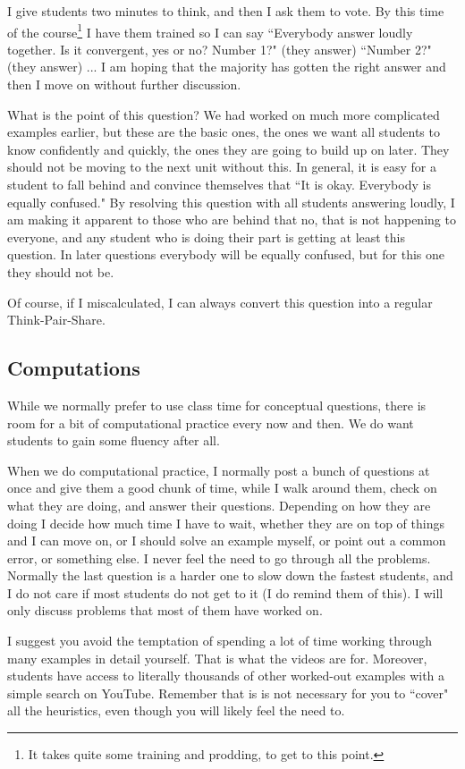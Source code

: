 \documentclass[11pt]{article}
\begin{document}
\begin{example}
		\begin{comments}
			{\baselineskip I give students two minutes to think, and then I ask them to vote. By this time of the course\footnote{It takes quite some training and prodding, to get to this point.} I have them trained so I can say ``Everybody answer loudly together. Is it convergent, yes or no? Number 1?" (they answer) ``Number 2?" (they answer) ... I am hoping that the majority has gotten the right answer and then I move on without further discussion.

			What is the point of this question? We had worked on much more complicated examples earlier, but these are the basic ones, the ones we want all students to know confidently and quickly, the ones they are going to build up on later. They should not be moving to the next unit without this. In general, it is easy for a student to fall behind and convince themselves that ``It is okay. Everybody is equally confused." By resolving this question with all students answering loudly, I am making it apparent to those who are behind that no, that is not happening to everyone, and any student who is doing their part is getting at least this question. In later questions everybody will be equally confused, but for this one they should not be.

			Of course, if I miscalculated, I can always convert this question into a regular Think-Pair-Share.}
		\end{comments}
	\end{example}

	\newpage

	\subsection{Computations}
	{\baselineskip While we normally prefer to use class time for conceptual questions, there is room for a bit of computational practice every now and then. We do want students to gain some fluency after all.

	When we do computational practice, I normally post a bunch of questions at once and give them a good chunk of time, while I walk around them, check on what they are doing, and answer their questions. Depending on how they are doing I decide how much time I have to wait, whether they are on top of things and I can move on, or I should solve an example myself, or point out a common error, or something else. I never feel the need to go through all the problems. Normally the last question is a harder one to slow down the fastest students, and I do not care if most students do not get to it (I do remind them of this). I will only discuss problems that most of them have worked on.

	I suggest you avoid the temptation of spending a lot of time working through many examples in detail yourself. That is what the videos are for. Moreover, students have access to literally thousands of other worked-out examples with a simple search on YouTube. Remember that is is not necessary for you to ``cover" all the heuristics, even though you will likely feel the need to.\\ }
\end{document}
